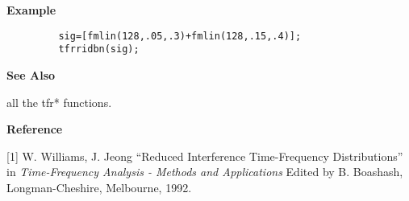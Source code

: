 {\bf \large {}\selectfont Example}
\begin{verbatim}
         sig=[fmlin(128,.05,.3)+fmlin(128,.15,.4)]; 
         tfrridbn(sig); 
\end{verbatim}
\vspace*{.5cm}


{\bf \large {}\selectfont See Also}\\
\hspace*{1.5cm}
\begin{minipage}[t]{13.5cm}
all the {\ty tfr*} functions.
\end{minipage}
\vspace*{.5cm}


{\bf \large {}\selectfont Reference}\\
\hspace*{1.5cm}
\begin{minipage}[t]{13.5cm}
[1] W. Williams, J. Jeong ``Reduced Interference Time-Frequency
Distributions'' in {\it Time-Frequency Analysis - Methods and
Applications} Edited by B. Boashash, Longman-Cheshire, Melbourne, 1992.
\end{minipage}


